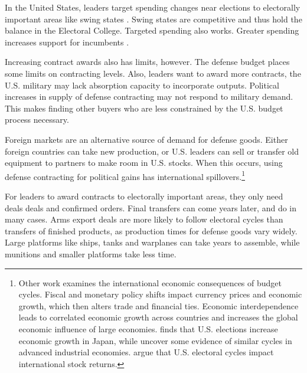 \documentclass[12pt]{article}
\begin{document}
In the United States, leaders target spending changes near elections to electorally important areas like swing states \citep{KrinerReeves2015}.
Swing states are competitive and thus hold the balance in the Electoral College. 
Targeted spending also works. 
Greater spending increases support for incumbents \citep{KrinerReeves2012}.




Increasing contract awards also has limits, however. 
The defense budget places some limits on contracting levels. 
Also, leaders want to award more contracts, the U.S. military may lack absorption capacity to incorporate outputs.
Political increases in supply of defense contracting may not respond to military demand.
This makes finding other buyers who are less constrained by the U.S. budget process necessary.


Foreign markets are an alternative source of demand for defense goods.
Either foreign countries can take new production, or U.S. leaders can sell or transfer old equipment to partners to make room in U.S. stocks. 
When this occurs, using defense contracting for political gains has international spillovers.\footnote{%
Other work examines the international economic consequences of budget cycles.
Fiscal and monetary policy shifts impact currency prices and economic growth, which then alters trade and financial ties. 
Economic interdependence leads to correlated economic growth across countries \citep{ArtisZhang1999, Kayser2006} and increases the global economic influence of large economies. 
\citet{Ito1991} finds that U.S. elections increase economic growth in Japan, while \citet{ThompsonZuk1983} uncover some evidence of similar cycles in advanced industrial economies.
\citet{FoersterSchmitz1997} argue that U.S. electoral cycles impact international stock returns.
}


For leaders to award contracts to electorally important areas, they only need deals deals and confirmed orders.
Final transfers can come years later, and do in many cases. 
Arms export deals are more likely to follow electoral cycles than transfers of finished products, as production times for defense goods vary widely. 
Large platforms like ships, tanks and warplanes can take years to assemble, while munitions and smaller platforms take less time. 
\end{document}
